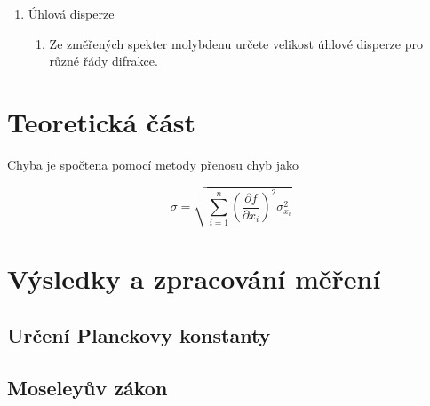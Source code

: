 \begin{enumerate}
\begin{enumerate}
\begin{enumerate}
        \item Přesvědčte se, že i naměřené polohy absorpčních hran Zr a Ni splňují Moseleyův zákon.

        \item Všimněte si, že absorpční hrana Ni koinciduje se spektrální čarou K$\beta$ mědi; této skutečnosti se využívá v rentgenové difraktografii pro monochromatizaci charakteristického spektra mědi. Z provedeného měření určete filtrační efekt niklu pro čáru K$\beta$.
    \end{enumerate}

\item Úhlová disperze

    \begin{enumerate}
        \item Ze změřených spekter molybdenu určete velikost úhlové disperze pro různé řády difrakce.
    \end{enumerate}
\end{enumerate}

\end{enumerate}

\section{Teoretická část}

Chyba je spočtena pomocí metody přenosu chyb \cite{bib:metoda-prenosu-chyb} jako

\begin{equation}
    \sigma = \sqrt{\sum^n_{i=1} \left( \frac{\partial f}{\partial x_i} \right)^2 \sigma^2_{x_i}}
\end{equation}

\section{Výsledky a zpracování měření}


\subsection{Určení Planckovy konstanty}


\subsection{Moseleyův zákon}

